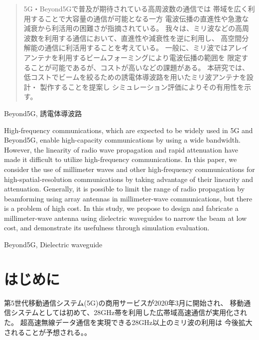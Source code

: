 \documentclass[technicalreport]{ieicej}
\begin{document}
\begin{abstract}
  5G・Beyond5Gで普及が期待されている高周波数の通信では
  帯域を広く利用することで大容量の通信が可能となる一方
  電波伝播の直進性や急激な減衰から利活用の困難さが指摘されている。
  我々は、ミリ波などの高周波数を利用する通信において、直進性や減衰性を逆に利用し、
  高空間分解能の通信に利活用することを考えている。
  一般に、ミリ波ではアレイアンテナを利用するビームフォーミングにより電波伝播の範囲を
  限定することが可能であるが、コストが高いなどの課題がある。
  本研究では、低コストでビームを絞るための誘電体導波路を用いたミリ波アンテナを設計・
  製作することを提案し
  シミュレーション評価によりその有用性を示す。
\end{abstract}
\begin{keyword}
Beyond5G, 誘電体導波路
\end{keyword}
\begin{eabstract}
High-frequency communications,
which are expected to be widely used in 5G and Beyond5G,
enable high-capacity communications by using a wide bandwidth.
However, the linearity of radio wave propagation and rapid attenuation
have made it difficult to utilize high-frequency communications.
In this paper, we consider the use of millimeter waves and
other high-frequency communications for high-spatial-resolution communications
by taking advantage of their linearity and attenuation.
Generally, it is possible to limit the range of radio propagation by
beamforming using array antennas in millimeter-wave communications,
but there is a problem of high cost.
In this study,
we propose to design and fabricate a millimeter-wave antenna using
dielectric waveguides to narrow the beam at low cost,
and demonstrate its usefulness through simulation evaluation.
\end{eabstract}
\begin{ekeyword}
Beyond5G, Dielectric waveguide
\end{ekeyword}
\maketitle

\section{はじめに}

第5世代移動通信システム(5G)の商用サービスが2020年3月に開始され、
移動通信システムとしては初めて、28GHz帯を利用した広帯域高速通信が実用化された。
超高速無線データ通信を実現できる28GHz以上のミリ波の利用は
今後拡大されることが予想される。\cite{docomo_6G_white_paper}。
\end{document}
